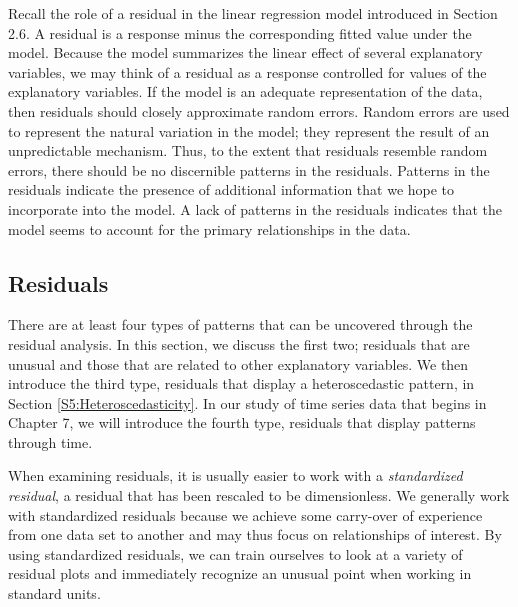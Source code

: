 Recall the role of a residual in the linear regression model
introduced in Section 2.6. A residual is a response minus the
corresponding fitted value under the model. Because the model
summarizes the linear effect of several explanatory variables, we
may think of a residual as a response controlled for values of the
explanatory variables. If the model is an adequate representation of
the data, then residuals should closely approximate random errors.
Random errors are used to represent the natural variation in the
model; they represent the result of an unpredictable mechanism.
Thus, to the extent that residuals resemble random errors, there
should be no discernible patterns in the residuals. Patterns in the
residuals indicate the presence of additional information that we
hope to incorporate into the model. A lack of patterns in the
residuals indicates that the model seems to account for the primary
relationships in the data.


\subsection{Residuals}\label{S5:Residuals}

There are at least four types of patterns that can be uncovered
through the residual analysis. In this section, we discuss the first
two; residuals that are unusual and those that are related to other
explanatory variables. We then introduce the third type, residuals
that display a heteroscedastic pattern, in Section
\ref{S5:Heteroscedasticity}. In our study of time series data that
begins in Chapter 7, we will introduce the fourth type, residuals
that display patterns through time.

When examining residuals, it is usually easier to work with a \textit{%
standardized residual}, a residual that has been rescaled to be
dimensionless. We generally work with standardized residuals because
we achieve some carry-over of experience from one data set to
another and may thus focus on relationships of interest. By using
standardized residuals, we can train ourselves to look at a variety
of residual plots and immediately recognize an unusual point when
working in standard units.

